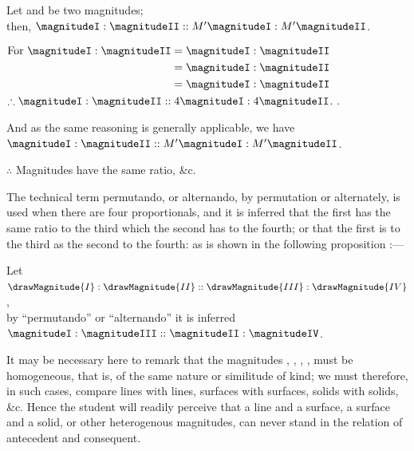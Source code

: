 \documentclass[booklanguage=english]{byrnebook}
\begin{document}
\begin{center}
Let  and  be two magnitudes;\\
then, $\magnitudeI : \magnitudeII :: M' \magnitudeI : M' \magnitudeII$.

$\begin{aligned}
\mbox{For } \magnitudeI : \magnitudeII &= \magnitudeI : \magnitudeII \\
&= \magnitudeI : \magnitudeII \\
&= \magnitudeI : \magnitudeII \\
\end{aligned}$\\
$\therefore \magnitudeI : \magnitudeII :: 4 \magnitudeI : 4 \magnitudeII$. .

And as the same reasoning is generally applicable, we have\\
$\magnitudeI : \magnitudeII :: M' \magnitudeI : M' \magnitudeII$.

$\therefore$ Magnitudes have the same ratio, \&c.
\end{center}

\vfill\pagebreak

\label{def:V.XIII} 
The technical term permutando, or alternando, by permutation or alternately, is used when there are four proportionals, and it is inferred that the first has the same ratio to the third which the second has to the fourth; or that the first is to the third as the second to the fourth: as is shown in the following proposition :—

\begin{center}
Let $\drawMagnitude{I} : \drawMagnitude{II} :: \drawMagnitude{III} : \drawMagnitude{IV}$,\\
by \enquote{permutando} or \enquote{alternando} it is inferred\\
$\magnitudeI : \magnitudeIII :: \magnitudeII : \magnitudeIV$.
\end{center}

It may be necessary here to remark that the magnitudes \magnitudeI, \magnitudeII, \magnitudeIII, \magnitudeIV, must be homogeneous, that is, of the same nature or similitude of kind; we must therefore, in such cases, compare lines with lines, surfaces with surfaces, solids with solids, \&c. Hence the student will readily perceive that a line and a surface, a surface and a solid, or other heterogenous magnitudes, can never stand in the relation of antecedent and consequent.
\end{document}
